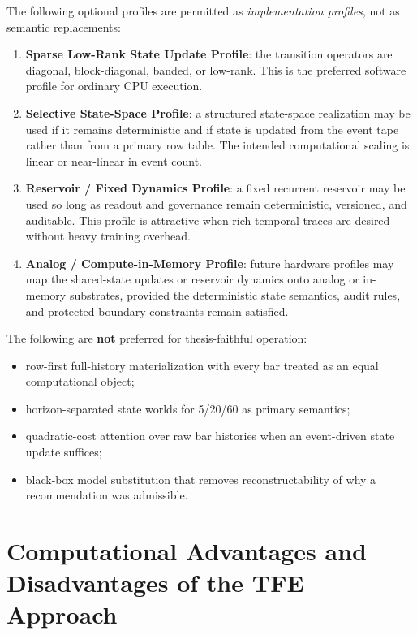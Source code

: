 The following optional profiles are permitted as \emph{implementation profiles}, not as semantic replacements:
\begin{enumerate}[leftmargin=1.2cm]
    \item \textbf{Sparse Low-Rank State Update Profile}: the transition operators are diagonal, block-diagonal, banded, or low-rank. This is the preferred software profile for ordinary CPU execution.
    \item \textbf{Selective State-Space Profile}: a structured state-space realization may be used if it remains deterministic and if state is updated from the event tape rather than from a primary row table. The intended computational scaling is linear or near-linear in event count.
    \item \textbf{Reservoir / Fixed Dynamics Profile}: a fixed recurrent reservoir may be used so long as readout and governance remain deterministic, versioned, and auditable. This profile is attractive when rich temporal traces are desired without heavy training overhead.
    \item \textbf{Analog / Compute-in-Memory Profile}: future hardware profiles may map the shared-state updates or reservoir dynamics onto analog or in-memory substrates, provided the deterministic state semantics, audit rules, and protected-boundary constraints remain satisfied.
\end{enumerate}

The following are \textbf{not} preferred for thesis-faithful operation:
\begin{itemize}
    \item row-first full-history materialization with every bar treated as an equal computational object;
    \item horizon-separated state worlds for 5/20/60 as primary semantics;
    \item quadratic-cost attention over raw bar histories when an event-driven state update suffices;
    \item black-box model substitution that removes reconstructability of why a recommendation was admissible.
\end{itemize}

\section{Computational Advantages and Disadvantages of the TFE Approach}

